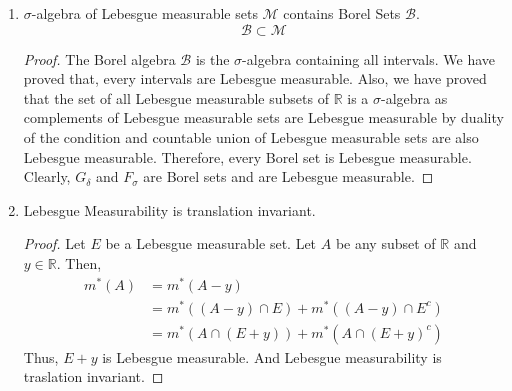 \begin{enumerate}
\begin{proof}
	Clearly, $\displaystyle m^\ast(A_1) \le \sum_{k=1}^\infty l(I_k')$ and $\displaystyle m^\ast(A_2) \le \sum_{k=1}^\infty l(I_k'')$.
	\begin{align*}
		m^\ast(A_1)+m^\ast(A_2) & \le \sum_{k=1}^\infty l(I_k') + \sum_{k=1}^\infty l(I_k'') \\
		& \le \sum_{k=1}^\infty l(I_k') + l(I_k'') \\
		& \le \sum_{k=1}^\infty l(I_k) \le m^\ast(A)
	\end{align*}
		Thus, $(a,\infty)$ is Lebesgue measurable.
		Therefore, every interval is Lebesgue measurable.
	\end{proof}
	\item $\sigma$-algebra of Lebesgue measurable sets $\mathcal{M}$ contains Borel Sets $\mathcal{B}$.
	\begin{equation}
		\mathcal{B} \subset \mathcal{M}
	\end{equation}
	\begin{proof}
	The Borel algebra $\mathcal{B}$ is the $\sigma$-algebra containing all intervals.
		We have proved that, every intervals are Lebesgue measurable.
		Also, we have proved that the set of all Lebesgue measurable subsets of $\mathbb{R}$ is a $\sigma$-algebra as complements of Lebesgue measurable sets are Lebesgue measurable by duality of the condition and countable union of Lebesgue measurable sets are also Lebesgue measurable.
		Therefore, every Borel set is Lebesgue measurable.
		Clearly, $G_\delta$ and $F_\sigma$ are Borel sets and are Lebesgue measurable.
	\end{proof}
	\item Lebesgue Measurability is translation invariant.
	\begin{proof}
		Let $E$ be a Lebesgue measurable set.
		Let $A$ be any subset of $\mathbb{R}$ and $y \in \mathbb{R}$.
		Then,
	\begin{align*}
		m^\ast(A) & = m^\ast(A-y)\\
		& = m^\ast((A-y) \cap E) + m^\ast((A-y) \cap E^c)\\
		& = m^\ast(A \cap (E+y)) + m^\ast(A \cap (E+y)^c)
	\end{align*}
		Thus, $E+y$ is Lebesgue measurable.
		And Lebesgue measurability is traslation invariant.
	\end{proof}
\end{enumerate}

